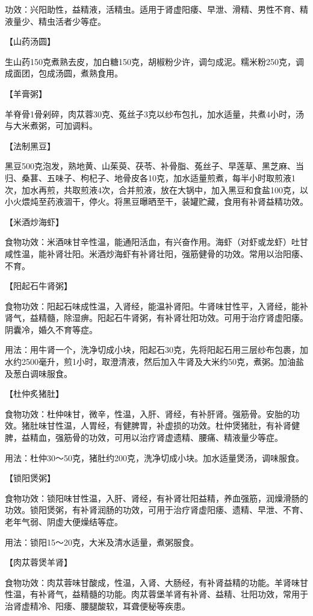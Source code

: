 \documentclass[12pt,UTF8,openany]{ctexbook}
\begin{document}
功效：兴阳助性，益精液，活精虫。适用于肾虚阳痿、早泄、滑精、男性不育、精液量少、精虫活者少等症。

【山药汤圆】

生山药150克煮熟去皮，加白糖150克，胡椒粉少许，调匀成泥。糯米粉250克，调成面团，包成汤圆，煮熟食用。

【羊膏粥】

羊脊骨1骨剁碎，肉苁蓉30克、菟丝子3克以纱布包扎，加水适量，共煮4小时，汤与大米煮粥，可加调料。

【法制黑豆】

黑豆500克泡发，熟地黄、山茱萸、茯苓、补骨脂、菟丝子、早莲草、黑芝麻、当归、桑葚、五味子、枸杞子、地骨皮各10克，加水适量煎煮，每半小时取煎液1次，加水再煎，共取煎液4次，合并煎液，放在大锅中，加入黑豆和食盐100克，以小火煨炖至药液涸干，停火。将黑豆曝晒至干，装罐贮藏，食用有补肾益精功效。

【米酒炒海虾】

食物功效：米酒味甘辛性温，能通阳活血，有兴奋作用。海虾（对虾或龙虾）吐甘咸性温，能补肾壮阳。米酒炒海虾有补肾壮阳，强筋健骨的功效。常用以治阳痿、不育。

【阳起石牛肾粥】

食物功效：阳起石味成性温，入肾经，能温补肾阳。牛肾味甘性平，入肾经，能补肾气，益精髓，除湿痹。阳起石牛肾粥，有补肾壮阳功效。可用于治疗肾虚阳痿。阴囊冷，婚久不育等症。

用法：用牛肾一个，洗净切成小块，阳起石30克，先将阳起石用三层纱布包裹，加水约2500毫升，煎1小时，取澄清液，然后加入牛肾及大米约50克，煮粥。加油盐及葱白调味服食。

【杜仲炙猪肚】

食物功效：杜仲味甘，微辛，性温，入肝、肾经，有补肝肾。强筋骨。安胎的功效。猪肚味甘性温，人胃经，有健脾胃，补虚损的功效。杜仲煲猪肚，有补肾健脾，益精血，强筋骨的功效，可用以治疗肾虚遗精、腰痛、精液量少等症。

用法：杜仲30～50克，猪肚约200克，洗净切成小块。加水适量煲汤，调味服食。

【锁阳煲粥】

食物功效：锁阳味甘性温，入肝、肾经，有补肾壮阳益精，养血强筋，润燥滑肠的功效。锁阳煲粥，有补肾润肠的功效，可用于治疗肾虚阳痿、遗精、早泄、不育、老年气弱、阴虚大便燥结等症。

用法：锁阳15～20克，大米及清水适量，煮粥服食。

【肉苁蓉煲羊肾】

食物功效：肉苁蓉味甘酸成，性温，入肾、大肠经，有补肾益精的功能。羊肾味甘性温，有补肾气，益精髓的功能。肉苁蓉堡羊肾有补肾、益精、壮阳功效，常用于治肾虚精冷、阳痿、腰腿酸软，耳聋便秘等疾患。
\end{document}
